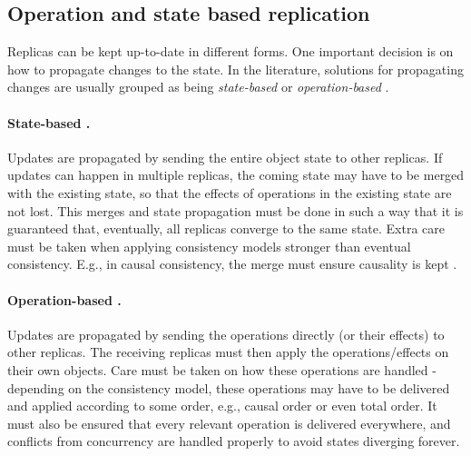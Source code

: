 
\subsection{Operation and state based replication}

Replicas can be kept up-to-date in different forms.
One important decision is on how to propagate changes to the state.
In the literature, solutions for propagating changes are usually grouped as being \emph{state-based} or \emph{operation-based} \cite{crdt}.


\paragraph{State-based \cite{crdt}.} Updates are propagated by sending the entire object state to other replicas.
If updates can happen in multiple replicas, the coming state may have to be merged with the existing state, so that the effects of operations in the existing state are not lost.
This merges and state propagation must be done in such a way that it is guaranteed that, eventually, all replicas converge to the same state.
Extra care must be taken when applying consistency models stronger than eventual consistency.
E.g., in causal consistency, the merge must ensure causality is kept \cite{understandingEC}.

\paragraph{Operation-based \cite{crdt}.}
Updates are propagated by sending the operations directly (or their effects) to other replicas.
The receiving replicas must then apply the operations/effects on their own objects.
Care must be taken on how these operations are handled - depending on the consistency model, these operations may have to be delivered and applied according to some order, e.g., causal order or even total order.
It must also be ensured that every relevant operation is delivered everywhere, and conflicts from concurrency are handled properly to avoid states diverging forever.

